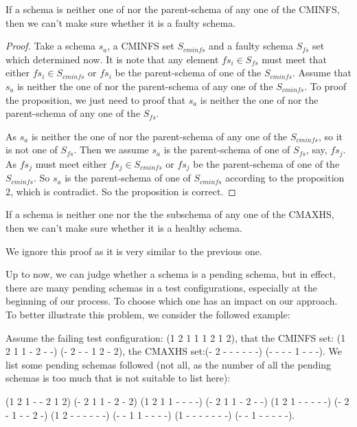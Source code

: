 \documentclass[10pt,journal,cspaper,compsoc]{IEEEtran}
\begin{document}
\begin{proposition}
If a schema is neither one of nor the parent-schema of any one of the CMINFS, then we can't make sure whether it is a faulty schema.
\end{proposition}
\begin{proof}
Take a schema $s_a$, a CMINFS set $S_{cminfs}$ and a faulty schema $S_{fs}$ set which determined now. It is note that any element $fs_i \in S_{fs}$ must meet that either $fs_i \in S_{cminfs}$ or $fs_i$ be the parent-schema of one of the $S_{cminfs}$. Assume that $s_a$ is neither the one of nor the parent-schema of any one of the $S_{cminfs}$. To proof the proposition, we just need to proof that $s_a$ is neither the one of nor the parent-schema of any one of the $S_{fs}$.

As $s_a$ is neither the one of nor the parent-schema of any one of the $S_{cminfs}$, so it is not one of $S_{fs}$. Then we assume $s_a$ is the parent-schema of one of $S_{fs}$, say, $fs_j$. As $fs_j$ must meet either $fs_j \in S_{cminfs}$ or $fs_j$ be the parent-schema of one of the $S_{cminfs}$. So $s_a$ is the parent-schema of one of $S_{cminfs}$ according to the proposition 2, which is contradict. So the proposition is correct.
\end{proof}

\begin{proposition}
If a schema is neither one nor the the subschema of any one of the CMAXHS, then we can't make sure whether it is a healthy schema.
\end{proposition}
We ignore this proof as it is very similar to the previous one.

Up to now, we can judge whether a schema is a pending schema, but in effect, there are many pending schemas in a test configurations, especially at the beginning of our process. To choose which one has an impact on our approach. To better illustrate this problem, we consider the followed example:

Assume the failing test configuration: (1 2 1 1 1 2 1 2), that the CMINFS set: (1 2 1 1 - 2 - -) (- 2 - - 1 2 - 2), the CMAXHS set:(- 2 - - - - - -) (- - - - 1 - - -). We list some pending schemas followed (not all, as the number of all the pending schemas is too much that is not suitable to list here):

(1 2 1 - - 2 1 2) (- 2 1 1 - 2 - 2) (1 2 1 1 - - - -) (- 2 1 1 - 2 - -) (1 2 1 - - - - -) (- 2 - 1 - - 2 -) (1 2 - - - - - -) (- - 1 1 - - - -) (1 - - - - - - -)  (- - 1 - - - - -).
\end{document}
